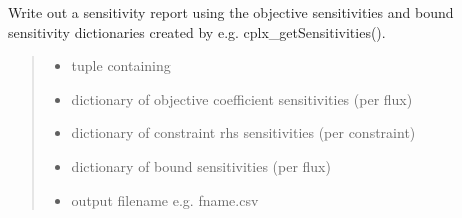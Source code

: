\documentclass[letterpaper,10pt,english]{sphinxmanual}
\begin{document}
\begin{fulllineitems}
\label{\detokenize{modules_doc:cbmpy.CBWrite.writeSensitivitiesToCSV}}
\pysigstartsignatures
{}
\pysigstopsignatures
\sphinxAtStartPar
Write out a sensitivity report using the objective sensitivities and
bound sensitivity dictionaries created by e.g. cplx\_getSensitivities().
\begin{quote}
\begin{itemize}
\item {} 
\sphinxAtStartPar
{} tuple containing

\end{itemize}
\begin{itemize}
\item {} 
\sphinxAtStartPar
{} dictionary of objective coefficient sensitivities (per flux)

\item {} 
\sphinxAtStartPar
{} dictionary of constraint rhs sensitivities (per constraint)

\item {} 
\sphinxAtStartPar
{} dictionary of bound sensitivities (per flux)

\end{itemize}
\begin{itemize}
\item {} 
\sphinxAtStartPar
{} output filename e.g. fname.csv

\end{itemize}
\end{quote}

\end{fulllineitems}

\end{document}
